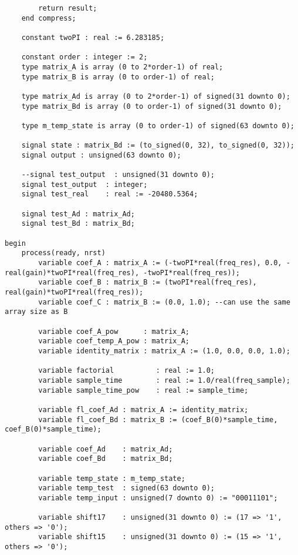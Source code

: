 \begin{lstlisting}
        return result;
    end compress;

    constant twoPI : real := 6.283185;

    constant order : integer := 2;
    type matrix_A is array (0 to 2*order-1) of real;
    type matrix_B is array (0 to order-1) of real;

    type matrix_Ad is array (0 to 2*order-1) of signed(31 downto 0);
    type matrix_Bd is array (0 to order-1) of signed(31 downto 0);

    type m_temp_state is array (0 to order-1) of signed(63 downto 0);

    signal state : matrix_Bd := (to_signed(0, 32), to_signed(0, 32));
    signal output : unsigned(63 downto 0);

    --signal test_output  : unsigned(31 downto 0);
    signal test_output  : integer;
    signal test_real    : real := -20480.5364;

    signal test_Ad : matrix_Ad;
    signal test_Bd : matrix_Bd;

begin
    process(ready, nrst)                       
        variable coef_A : matrix_A := (-twoPI*real(freq_res), 0.0, -real(gain)*twoPI*real(freq_res), -twoPI*real(freq_res));
        variable coef_B : matrix_B := (twoPI*real(freq_res), real(gain)*twoPI*real(freq_res));
        variable coef_C : matrix_B := (0.0, 1.0); --can use the same array size as B
        
        variable coef_A_pow      : matrix_A;
        variable coef_temp_A_pow : matrix_A;
        variable identity_matrix : matrix_A := (1.0, 0.0, 0.0, 1.0);

        variable factorial          : real := 1.0;
        variable sample_time        : real := 1.0/real(freq_sample);
        variable sample_time_pow    : real := sample_time;

        variable fl_coef_Ad : matrix_A := identity_matrix;
        variable fl_coef_Bd : matrix_B := (coef_B(0)*sample_time, coef_B(0)*sample_time);

        variable coef_Ad    : matrix_Ad;
        variable coef_Bd    : matrix_Bd;

        variable temp_state : m_temp_state;
        variable temp_test  : signed(63 downto 0);
        variable temp_input : unsigned(7 downto 0) := "00011101";

        variable shift17    : unsigned(31 downto 0) := (17 => '1', others => '0');
        variable shift15    : unsigned(31 downto 0) := (15 => '1', others => '0');
        

\end{lstlisting}

